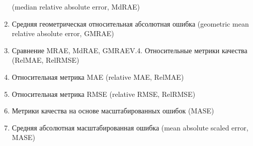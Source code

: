 \begin{enumerate}
    (median relative absolute error, MdRAE)
  \item Средняя геометрическая относительная абсолютная ошибка
    (geometric mean relative absolute error, GMRAE)
  \item Сравнение MRAE, MdRAE, GMRAEV.4. Относительные метрики
    качества (RelMAE, RelRMSE)
  \item Относительная метрика MAE (relative MAE, RelMAE)
  \item Относительная метрика RMSE (relative RMSE, RelRMSE)
  \item Метрики качества на основе масштабированных ошибок
    (MASE)
  \item Средняя абсолютная масштабированная ошибка
    (mean absolute scaled error, MASE)

\end{enumerate}